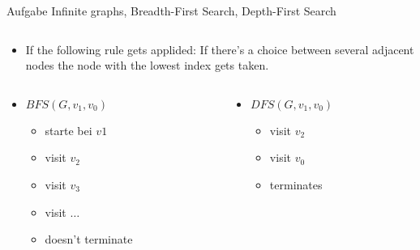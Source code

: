 \begin{frame}[allowframebreaks]{Aufgabe \thesection}{Infinite graphs, Breadth-First Search, Depth-First Search}
\begin{solution}
\begin{columns}
\begin{column}[t]{0.5\textwidth}
{\begin{minipage}{1\textwidth}
            \vspace{0.25cm}
            \begin{itemize}
              \item \alert{If the following rule gets applided:} If there's a choice between several adjacent nodes the node with the lowest index gets taken.
            \end{itemize}
            \begin{columns}
              \begin{column}[t]{0.5\linewidth}
                \begin{itemize}
                  \item $BFS(G, v_1, v_0)$
                  \begin{itemize}
                    \item starte bei $v1$
                    \item visit $v_2$
                    \item visit $v_3$
                    \item visit $\ldots$
                    \item doesn't terminate
                  \end{itemize}
                \end{itemize}
              \end{column}
              \begin{column}[t]{0.5\linewidth}
                \begin{itemize}
                  \item $DFS(G, v_1, v_0)$
                  \begin{itemize}
                    \item visit $v_2$
                    \item visit $v_0$
                    \item terminates
                  \end{itemize}
                \end{itemize}
              \end{column}
            \end{columns}


\end{minipage}}
\end{column}
\end{columns}
\end{solution}
\end{frame}
